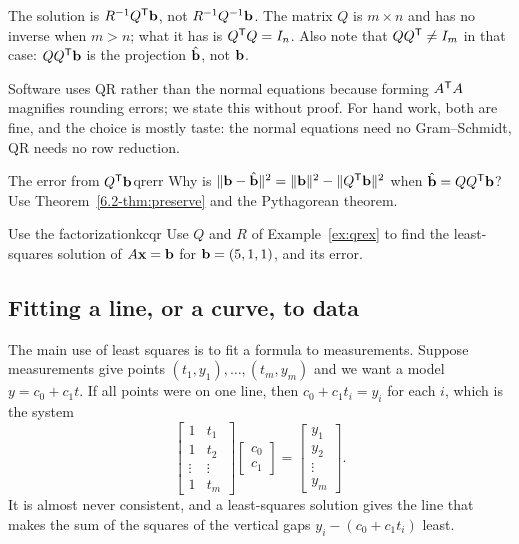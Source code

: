\documentclass[11pt]{article}
\begin{document}
\begin{warn}
The solution is $R^{-1}Q^{\mathsf T}\mathbf{b}$, not $R^{-1}Q^{-1}\mathbf{b}$. The matrix $Q$ is $m\times n$ and has no inverse when $m>n$; what it has is $Q^{\mathsf T} Q=I_n$. Also note that $QQ^{\mathsf T}\neq I_m$ in that case: $QQ^{\mathsf T}\mathbf{b}$ is the projection $\hat{\mathbf{b}}$, not $\mathbf{b}$.
\end{warn}

Software uses QR rather than the normal equations because forming $A^{\mathsf T} A$ magnifies rounding errors; we state this without proof. For hand work, both are fine, and the choice is mostly taste: the normal equations need no Gram--Schmidt, QR needs no row reduction.

\begin{think}{The error from $Q^{\mathsf T}\mathbf{b}$}{qrerr}
Why is $\lVert\mathbf{b}-\hat{\mathbf{b}}\rVert^2=\lVert\mathbf{b}\rVert^2-\lVert Q^{\mathsf T}\mathbf{b}\rVert^2$ when $\hat{\mathbf{b}}=QQ^{\mathsf T}\mathbf{b}$? Use Theorem~\ref{6.2-thm:preserve} and the Pythagorean theorem.
\end{think}

\begin{kc}{Use the factorization}{kcqr}
Use $Q$ and $R$ of Example~\ref{ex:qrex} to find the least-squares solution of $A\mathbf{x}=\mathbf{b}$ for $\mathbf{b}=(5,1,1)$, and its error.
\end{kc}

\subsection*{Fitting a line, or a curve, to data}

The main use of least squares is to fit a formula to measurements. Suppose measurements give points $(t_1,y_1),\dots,(t_m,y_m)$ and we want a model $y=c_0+c_1t$. If all points were on one line, then $c_0+c_1t_i=y_i$ for each $i$, which is the system
\[
\begin{bmatrix}1&t_1\\1&t_2\\\vdots&\vdots\\1&t_m\end{bmatrix}\begin{bmatrix}c_0\\c_1\end{bmatrix}=\begin{bmatrix}y_1\\y_2\\\vdots\\y_m\end{bmatrix}.
\]
It is almost never consistent, and a least-squares solution gives the line that makes the sum of the squares of the vertical gaps $y_i-(c_0+c_1t_i)$ least.
\end{document}
